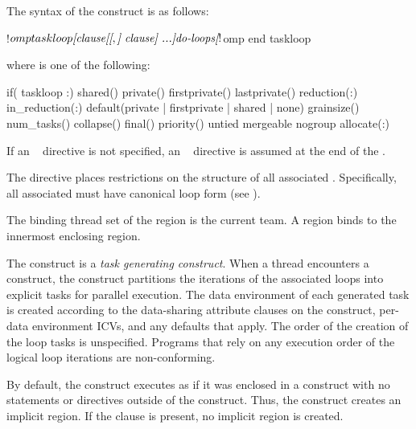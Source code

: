 \begin{fortranspecific}
The syntax of the  construct is as follows:
\begin{ompfPragma}
!$omp taskloop \plc{[clause[[},\plc{] clause] ...]}
    \plc{do-loops}
\plc{[}!$omp end taskloop\plc{]}
\end{ompfPragma}
where  is one of the following:
\begin{indentedcodelist}
if(\plc{[} taskloop :\plc{] scalar-logical-expression})
shared()
private()
firstprivate()
lastprivate()
reduction(:)
in_reduction(:)
default(private \textnormal{|} firstprivate \textnormal{|} shared \textnormal{|} none)
grainsize()
num_tasks()
collapse()
final()
priority()
untied
mergeable
nogroup
allocate(\plc{[allocator }:\plc{] list})
\end{indentedcodelist}

If an ~ directive is not specified, an
~ directive is assumed at the end of the
.

The  directive places restrictions on the structure of all
associated . Specifically, all associated  must
have canonical loop form (see ).
\end{fortranspecific}

\binding
The binding thread set of the  region is the current team. 
A  region binds to the innermost enclosing  region.

\descr
The  construct is a \emph{task generating construct}. When a 
thread encounters a  construct, the construct partitions the 
iterations of the associated loops into explicit tasks for parallel execution.
The data environment of each generated task is created according to the 
data-sharing attribute clauses on the  construct, per-data 
environment ICVs, and any defaults that apply. The order of the 
creation of the loop tasks is unspecified. Programs that rely on any execution 
order of the logical loop iterations are non-conforming.

By default, the  construct executes as if it was enclosed in a 
 construct with no statements or directives outside of the 
 construct. Thus, the  construct creates an 
implicit  region. If the  clause is present, 
no implicit  region is created.

